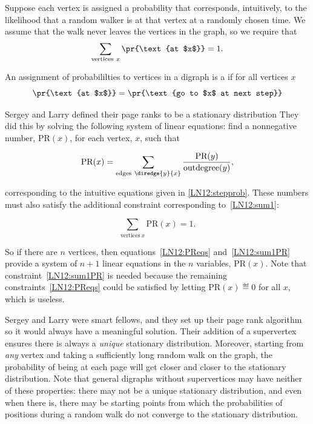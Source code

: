 \begin{example}
Suppose each vertex is assigned a probability that corresponds, intuitively,
to the likelihood that a random walker is at that vertex at a randomly
chosen time.  We assume that the walk never leaves the vertices in the graph,
so we require that
\begin{equation}\label{LN12:sum1}
\sum_{\text{vertices}\ x} \pr{\text{at $x$}} = 1.
\end{equation}

\begin{definition} An assignment of probabililties to vertices in a digraph
  is a  if for all vertices $x$
\[
\pr{\text{at $x$}} = \pr{\text{go to $x$ at next step}}
\]
\end{definition}  

Sergey and Larry defined their page ranks to be a stationary distribution
They did this by solving the following system of linear equations: find a
nonnegative number, $\text{PR}(x)$, for each vertex, $x$, such that

\begin{equation}\label{LN12:PReqs}
\text{PR}(x) = \sum_{\text{edges}\ \diredge{y}{x}} \frac{\text{PR}(y)}{\text{outdegree}(y)},
\end{equation}

corresponding to the intuitive equations given in \eqref{LN12:stepprob}.
These numbers must also satisfy the additional constraint corresponding
to~\eqref{LN12:sum1}:

\begin{equation}\label{LN12:sum1PR}
\sum_{\text{vertices}\ x} \text{PR}(x) = 1.
\end{equation}

So if there are $n$ vertices, then equations~\eqref{LN12:PReqs}
and~\eqref{LN12:sum1PR} provide a system of $n+1$ linear equations in the
$n$ variables, $\text{PR}(x)$.  Note that constraint~\eqref{LN12:sum1PR}
is needed because the remaining constraints~\eqref{LN12:PReqs} could be
satisfied by letting $\text{PR}(x)\eqdef 0$ for all $x$, which is useless.

Sergey and Larry were smart fellows, and they set up their page rank
algorithm so it would always have a meaningful solution.  Their addition
of a supervertex ensures there is always a \emph{unique} stationary
distribution.  Moreover, starting from \emph{any} vertex and taking a
sufficiently long random walk on the graph, the probability of being at
each page will get closer and closer to the stationary distribution.  Note
that general digraphs without supervertices may have neither of these
properties: there may not be a unique stationary distribution, and even
when there is, there may be starting points from which the probabilities
of positions during a random walk do not converge to the stationary
distribution.  


\end{example}
